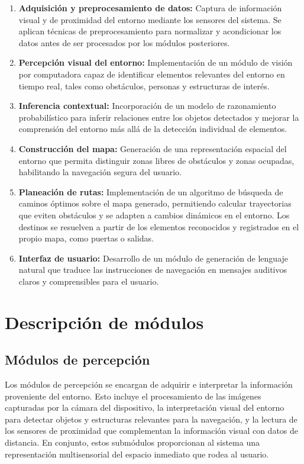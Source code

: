 \begin{enumerate}
    \item \textbf{Adquisición y preprocesamiento de datos:} Captura de información visual y de proximidad del entorno mediante los sensores del sistema. Se aplican técnicas de preprocesamiento para normalizar y acondicionar los datos antes de ser procesados por los módulos posteriores.

    \item \textbf{Percepción visual del entorno:} Implementación de un módulo de visión por computadora capaz de identificar elementos relevantes del entorno en tiempo real, tales como obstáculos, personas y estructuras de interés.

    \item \textbf{Inferencia contextual:} Incorporación de un modelo de razonamiento probabilístico para inferir relaciones entre los objetos detectados y mejorar la comprensión del entorno más allá de la detección individual de elementos.

    \item \textbf{Construcción del mapa:} Generación de una representación espacial del entorno que permita distinguir zonas libres de obstáculos y zonas ocupadas, habilitando la navegación segura del usuario.

    \item \textbf{Planeación de rutas:} Implementación de un algoritmo de búsqueda de caminos óptimos sobre el mapa generado, permitiendo calcular trayectorias que eviten obstáculos y se adapten a cambios dinámicos en el entorno. Los destinos se resuelven a partir de los elementos reconocidos y registrados en el propio mapa, como puertas o salidas.

    \item \textbf{Interfaz de usuario:} Desarrollo de un módulo de generación de lenguaje natural que traduce las instrucciones de navegación en mensajes auditivos claros y comprensibles para el usuario.
\end{enumerate}

\section{Descripción de módulos}

\subsection{Módulos de percepción}

Los módulos de percepción se encargan de adquirir e interpretar la información proveniente del entorno. Esto incluye el procesamiento de las imágenes capturadas por la cámara del dispositivo, la interpretación visual del entorno para detectar objetos y estructuras relevantes para la navegación, y la lectura de los sensores de proximidad que complementan la información visual con datos de distancia. En conjunto, estos submódulos proporcionan al sistema una representación multisensorial del espacio inmediato que rodea al usuario.

